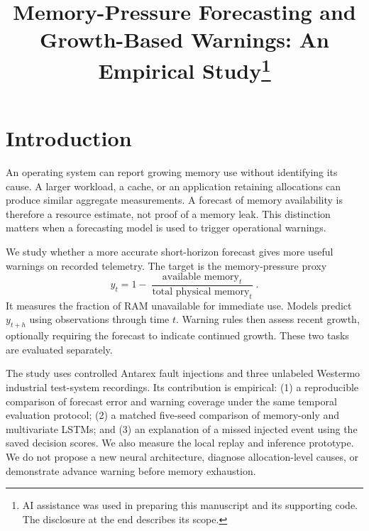 \documentclass{llncs}
\begin{document}
\title{Memory-Pressure Forecasting and Growth-Based Warnings: An Empirical Study\thanks{AI assistance was used in preparing this manuscript and its supporting code. The disclosure at the end describes its scope.}}
\author{}
\institute{}
\maketitle
\thispagestyle{empty}
\begin{abstract}

\end{abstract}

\section{Introduction}
An operating system can report growing memory use without identifying its cause. A larger workload, a cache, or an application retaining allocations can produce similar aggregate measurements. A forecast of memory availability is therefore a resource estimate, not proof of a memory leak. This distinction matters when a forecasting model is used to trigger operational warnings.

We study whether a more accurate short-horizon forecast gives more useful warnings on recorded telemetry. The target is the memory-pressure proxy
\begin{equation}
y_t=1-\frac{\operatorname{available\ memory}_t}{\operatorname{total\ physical\ memory}_t}.
\label{eq:target}
\end{equation}
It measures the fraction of RAM unavailable for immediate use. Models predict $y_{t+h}$ using observations through time $t$. Warning rules then assess recent growth, optionally requiring the forecast to indicate continued growth. These two tasks are evaluated separately.

The study uses controlled Antarex fault injections and three unlabeled Westermo industrial test-system recordings. Its contribution is empirical: (1) a reproducible comparison of forecast error and warning coverage under the same temporal evaluation protocol; (2) a matched five-seed comparison of memory-only and multivariate LSTMs; and (3) an explanation of a missed injected event using the saved decision scores. We also measure the local replay and inference prototype. We do not propose a new neural architecture, diagnose allocation-level causes, or demonstrate advance warning before memory exhaustion.
\end{document}
